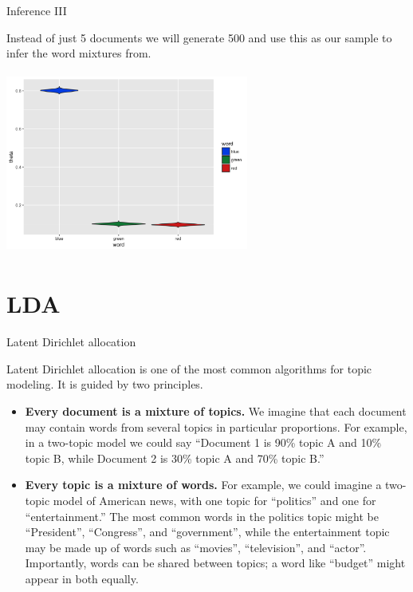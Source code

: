 \documentclass[
  ignorenonframetext,
]{beamer}
\providecommand{\tightlist}{%
  \setlength{\itemsep}{0pt}\setlength{\parskip}{0pt}}
\begin{document}
\begin{frame}{Inference III}
\protect\hypertarget{inference-iii}{}

Instead of just 5 documents we will generate 500 and use this as our
sample to infer the word mixtures from.

\begin{center}\includegraphics[width=8cm,height=6cm]{figures/unigramInference500} \end{center}

\end{frame}

\hypertarget{lda}{%
\section{LDA}\label{lda}}

\begin{frame}{Latent Dirichlet allocation}
\protect\hypertarget{latent-dirichlet-allocation}{}

\footnotesize

Latent Dirichlet allocation is one of the most common algorithms for
topic modeling. It is guided by two principles.

\begin{itemize}
\tightlist
\item
  \textbf{Every document is a mixture of topics.} We imagine that each
  document may contain words from several topics in particular
  proportions. For example, in a two-topic model we could say ``Document
  1 is 90\% topic A and 10\% topic B, while Document 2 is 30\% topic A
  and 70\% topic B.''
\item
  \textbf{Every topic is a mixture of words.} For example, we could
  imagine a two-topic model of American news, with one topic for
  ``politics'' and one for ``entertainment.'' The most common words in
  the politics topic might be ``President'', ``Congress'', and
  ``government'', while the entertainment topic may be made up of words
  such as ``movies'', ``television'', and ``actor''. Importantly, words
  can be shared between topics; a word like ``budget'' might appear in
  both equally.
\end{itemize}

\end{frame}
\end{document}

